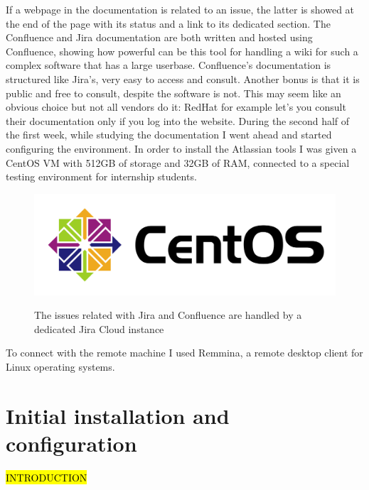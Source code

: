 	If a webpage in the documentation is related to an issue, the latter is showed at the end of the page with its status and a link to its dedicated section. 
	The Confluence and Jira documentation are both written and hosted using Confluence, showing how powerful can be this tool for handling a wiki for such a complex software that has a large userbase.
	Confluence's documentation is structured like Jira's, very easy to access and consult.	
	Another bonus is that it is public and free to consult, despite the software is not.
	This may seem like an obvious choice but not all vendors do it: RedHat for example let's you consult their documentation only if you log into the website.
	During the second half of the first week, while studying the documentation I went ahead and started configuring the environment.
	In order to install the Atlassian tools I was given a CentOS VM with 512GB of storage and 32GB of RAM, connected to a special testing environment for internship students.
	\begin{figure}[H]
		\centering
		\includegraphics[width=1\textwidth]{resources/centos_logo}\\
		\caption{The issues related with Jira and Confluence are handled by a dedicated Jira Cloud instance}
	\end{figure}
	To connect with the remote machine I used Remmina, a remote desktop client for Linux operating systems.
	
\section{Initial installation and configuration}
	
	\hl{INTRODUCTION}
	

